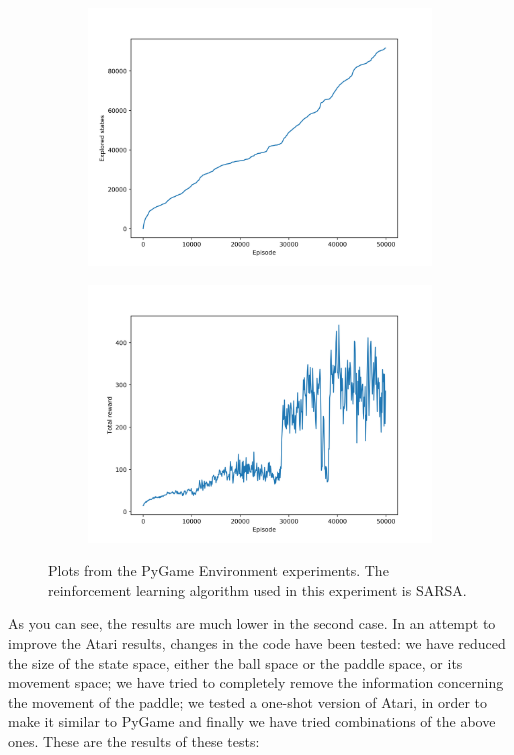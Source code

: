 \begin{figure}
\centering
\begin{subfigure}[h]{\linewidth}
\includegraphics[width=\linewidth]{images/pygame-explored-states.png}
\centering
\end{subfigure}
\hfill
\begin{subfigure}[h]{\linewidth}
\includegraphics[width=\linewidth]{images/pygame-total-reward.png}
\centering
\end{subfigure}
\caption{Plots from the PyGame Environment experiments. The reinforcement learning algorithm used in this experiment is SARSA.}
\end{figure}

As you can see, the results are much lower in the second case. In an attempt to improve the Atari results, changes in the code have been tested: we have reduced the size of the state space, either the ball space or the paddle space, or its movement space; we have tried to completely remove the information concerning the movement of the paddle; we tested a one-shot version of Atari, in order to make it similar to PyGame and finally we have tried combinations of the above ones. These are the results of these tests:

